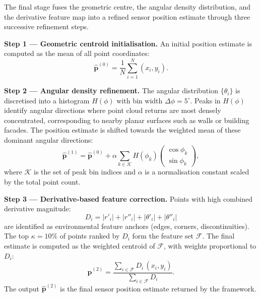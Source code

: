 \documentclass[lettersize,journal]{IEEEtran}
\begin{document}
The final stage fuses the geometric centre, the angular density distribution,
and the derivative feature map into a refined sensor position estimate through
three successive refinement steps.

\textbf{Step 1 — Geometric centroid initialisation.}
An initial position estimate is computed as the mean of all point coordinates:
\begin{equation}
  \hat{\mathbf{p}}^{(0)} = \frac{1}{N} \sum_{i=1}^{N} (x_i, y_i).
  \label{eq:centroid}
\end{equation}

\textbf{Step 2 — Angular density refinement.}
The angular distribution $\{\theta_i\}$ is discretised into a histogram
$H(\phi)$ with bin width $\Delta\phi = 5^{\circ}$. Peaks in $H(\phi)$ identify
angular directions where point cloud returns are most densely concentrated,
corresponding to nearby planar surfaces such as walls or building facades.
The position estimate is shifted towards the weighted mean of these dominant
angular directions:
\begin{equation}
  \hat{\mathbf{p}}^{(1)} = \hat{\mathbf{p}}^{(0)} +
  \alpha \sum_{k \in \mathcal{K}}
  H(\phi_k) \begin{pmatrix} \cos\phi_k \\ \sin\phi_k \end{pmatrix},
  \label{eq:angularshift}
\end{equation}
where $\mathcal{K}$ is the set of peak bin indices and $\alpha$ is a
normalisation constant scaled by the total point count.

\textbf{Step 3 — Derivative-based feature correction.}
Points with high combined derivative magnitude:
\begin{equation}
  D_i = |r'_i| + |r''_i| + |\theta'_i| + |\theta''_i|
  \label{eq:deriv_magnitude}
\end{equation}
are identified as environmental feature anchors (edges, corners,
discontinuities). The top $\kappa = 10\%$ of points ranked by $D_i$ form
the feature set $\mathcal{F}$. The final estimate is computed as the
weighted centroid of $\mathcal{F}$, with weights proportional to $D_i$:
\begin{equation}
  \hat{\mathbf{p}}^{(2)} = \frac{\sum_{i \in \mathcal{F}} D_i\, (x_i, y_i)}
                                 {\sum_{i \in \mathcal{F}} D_i}.
  \label{eq:featurecentroid}
\end{equation}
The output $\hat{\mathbf{p}}^{(2)}$ is the final sensor position estimate
returned by the framework.
\end{document}
